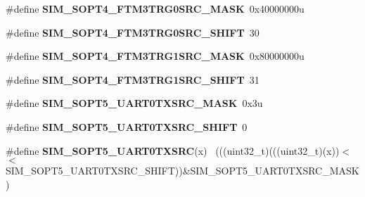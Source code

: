 \begin{DoxyCompactItemize}
\item 
\hypertarget{group___s_i_m___register___masks_gabc6374f1f0ccc17a93f55a32e6eb9c89}{}\#define {\bfseries S\+I\+M\+\_\+\+S\+O\+P\+T4\+\_\+\+F\+T\+M3\+T\+R\+G0\+S\+R\+C\+\_\+\+M\+A\+S\+K}~0x40000000u\label{group___s_i_m___register___masks_gabc6374f1f0ccc17a93f55a32e6eb9c89}

\item 
\hypertarget{group___s_i_m___register___masks_gaddc879ce1fd5df4ad46528983ad4480e}{}\#define {\bfseries S\+I\+M\+\_\+\+S\+O\+P\+T4\+\_\+\+F\+T\+M3\+T\+R\+G0\+S\+R\+C\+\_\+\+S\+H\+I\+F\+T}~30\label{group___s_i_m___register___masks_gaddc879ce1fd5df4ad46528983ad4480e}

\item 
\hypertarget{group___s_i_m___register___masks_gad6e00a798bfd9206fe31e2fa2b3a4171}{}\#define {\bfseries S\+I\+M\+\_\+\+S\+O\+P\+T4\+\_\+\+F\+T\+M3\+T\+R\+G1\+S\+R\+C\+\_\+\+M\+A\+S\+K}~0x80000000u\label{group___s_i_m___register___masks_gad6e00a798bfd9206fe31e2fa2b3a4171}

\item 
\hypertarget{group___s_i_m___register___masks_ga837c289419ec9b1924a8fd50f6afef5c}{}\#define {\bfseries S\+I\+M\+\_\+\+S\+O\+P\+T4\+\_\+\+F\+T\+M3\+T\+R\+G1\+S\+R\+C\+\_\+\+S\+H\+I\+F\+T}~31\label{group___s_i_m___register___masks_ga837c289419ec9b1924a8fd50f6afef5c}

\item 
\hypertarget{group___s_i_m___register___masks_ga11646c1292cb7aab3128e1e563847e32}{}\#define {\bfseries S\+I\+M\+\_\+\+S\+O\+P\+T5\+\_\+\+U\+A\+R\+T0\+T\+X\+S\+R\+C\+\_\+\+M\+A\+S\+K}~0x3u\label{group___s_i_m___register___masks_ga11646c1292cb7aab3128e1e563847e32}

\item 
\hypertarget{group___s_i_m___register___masks_ga0220b88df4a0747579d24b77f4db4e67}{}\#define {\bfseries S\+I\+M\+\_\+\+S\+O\+P\+T5\+\_\+\+U\+A\+R\+T0\+T\+X\+S\+R\+C\+\_\+\+S\+H\+I\+F\+T}~0\label{group___s_i_m___register___masks_ga0220b88df4a0747579d24b77f4db4e67}

\item 
\hypertarget{group___s_i_m___register___masks_gaae8f435ecf7230b287a09bcb1bad59e0}{}\#define {\bfseries S\+I\+M\+\_\+\+S\+O\+P\+T5\+\_\+\+U\+A\+R\+T0\+T\+X\+S\+R\+C}(x)                                ~(((uint32\+\_\+t)(((uint32\+\_\+t)(x))$<$$<$S\+I\+M\+\_\+\+S\+O\+P\+T5\+\_\+\+U\+A\+R\+T0\+T\+X\+S\+R\+C\+\_\+\+S\+H\+I\+F\+T))\&S\+I\+M\+\_\+\+S\+O\+P\+T5\+\_\+\+U\+A\+R\+T0\+T\+X\+S\+R\+C\+\_\+\+M\+A\+S\+K)\label{group___s_i_m___register___masks_gaae8f435ecf7230b287a09bcb1bad59e0}


\end{DoxyCompactItemize}
